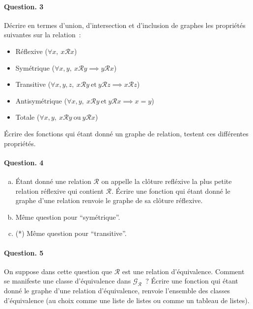 \documentclass[10pt,a4paper]{article}
\begin{document}
\paragraph{Question. 3\\}
Décrire en termes d'union, d'intersection et d'inclusion de graphes les 
propriétés suivantes sur la relation~:
\begin{itemize}
\item Réflexive ($\forall x, \ x\mathcal{R}x$)
\item Symétrique ($\forall x,y, \ x\mathcal{R}y \implies y\mathcal{R}x$)
\item Transitive ($\forall x,y,z, \ x\mathcal{R}y \ \mathrm{et} \ y\mathcal{R}z \implies x\mathcal{R}z$)
\item Antisymétrique ($\forall x,y, \ x\mathcal{R}y \ \mathrm{et} \ y\mathcal{R}x \implies x=y$)
\item Totale ($\forall x,y, \ x\mathcal{R}y \ \mathrm{ou} \ y\mathcal{R}x$)
\end{itemize}  
Écrire des fonctions qui étant donné un graphe de relation, testent ces 
différentes propriétés.

\paragraph{Question. 4\\}
\begin{enumerate}[a)]
\item Étant donné une relation $\mathcal{R}$ on appelle la clôture refléxive
la plus petite relation réflexive qui contient $\mathcal{R}$. Écrire une 
fonction qui étant donné le graphe d'une relation renvoie le graphe de sa 
clôture réflexive.
\item Même question pour ``symétrique''.
\item (*) Même question pour ``transitive''.
\end{enumerate}

\paragraph{Question. 5\\}
On suppose dans cette question que $\mathcal{R}$ est une relation d'équivalence.
Comment se manifeste une classe
d'équivalence dans $\mathcal{G}_{\mathcal{R}}$~? Écrire une fonction qui étant 
donné le graphe d'une relation d'équivalence, renvoie l'ensemble des classes 
d'équivalence (au choix comme une liste de listes ou comme un tableau de listes).
\end{document}
